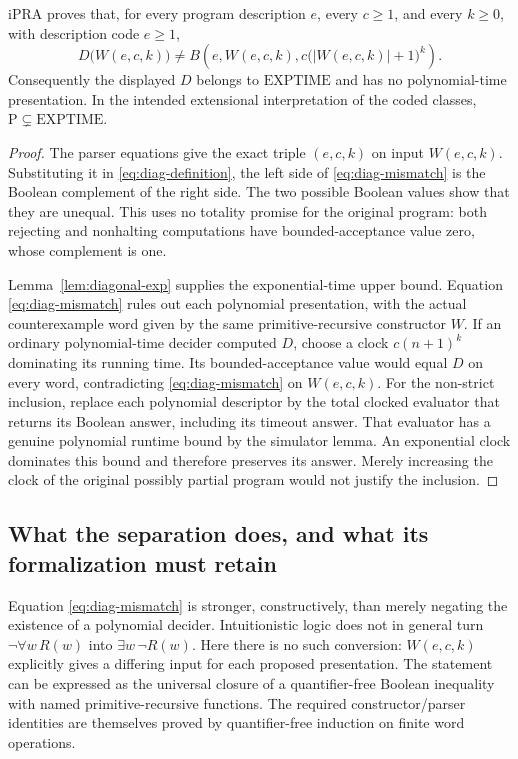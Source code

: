 \begin{theorem}
\label{thm:explicit-diagonal}
iPRA proves that, for every program description \(e\), every \(c\geq1\), and
every \(k\geq0\), with description code \(e\ge1\),
\begin{equation}
  D\bigl(W(e,c,k)\bigr)
  \ne
  B\!\left(e,W(e,c,k),
       c\bigl(|W(e,c,k)|+1\bigr)^k\right).
  \label{eq:diag-mismatch}
\end{equation}
Consequently the displayed \(D\) belongs to \(\mathrm{EXPTIME}\) and has no
polynomial-time presentation.  In the intended extensional interpretation
of the coded classes, \(\mathrm{P}\subsetneq\mathrm{EXPTIME}\).
\end{theorem}

\begin{proof}
The parser equations give the exact triple \((e,c,k)\) on input
\(W(e,c,k)\).  Substituting it in \eqref{eq:diag-definition}, the left side of \eqref{eq:diag-mismatch} is the Boolean
complement of the right side.  The two possible Boolean values show that
they are unequal.  This uses no totality promise for the original program:
both rejecting and nonhalting computations have bounded-acceptance value
zero, whose complement is one.

Lemma~\ref{lem:diagonal-exp} supplies the exponential-time upper bound.
Equation \eqref{eq:diag-mismatch} rules out each polynomial presentation, with the actual
counterexample word given by the same primitive-recursive constructor
\(W\).  If an ordinary polynomial-time decider computed \(D\), choose a
clock \(c(n+1)^k\) dominating its running time.  Its bounded-acceptance
value would equal \(D\) on every word, contradicting \eqref{eq:diag-mismatch} on
\(W(e,c,k)\). For the non-strict inclusion, replace each polynomial
descriptor by the total clocked evaluator that returns its Boolean answer,
including its timeout answer. That evaluator has a genuine polynomial
runtime bound by the simulator lemma. An exponential clock dominates this
bound and therefore preserves its answer. Merely increasing the clock of
the original possibly partial program would not justify the inclusion.
\end{proof}

\subsection{What the separation does, and what its formalization must retain}

Equation \eqref{eq:diag-mismatch} is stronger, constructively, than merely negating the existence
of a polynomial decider.  Intuitionistic logic does not in general turn
\(\neg\forall w\,R(w)\) into \(\exists w\,\neg R(w)\).  Here there is no such
conversion: \(W(e,c,k)\) explicitly gives a differing input for each proposed
presentation.  The statement can be expressed as the universal closure of
a quantifier-free Boolean inequality with named primitive-recursive
functions.  The required constructor/parser identities are themselves
proved by quantifier-free induction on finite word operations.

